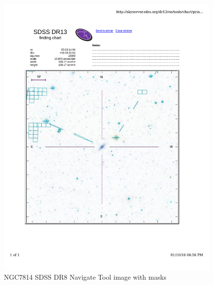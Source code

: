 \documentclass[10pt,letterpaper]{article}
\begin{document}
\begin{figure}[h!]
\centering
\includegraphics[scale=0.7]{figures/NGC7814.pdf}
\caption{NGC7814 SDSS DR8 Navigate Tool image with masks}
\end{figure}
\end{document}
